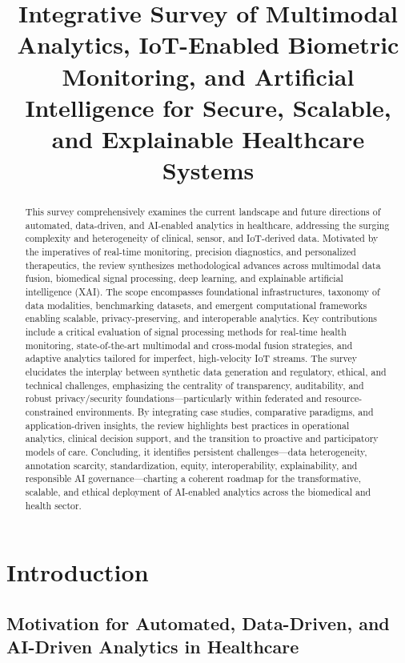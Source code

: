 \title{Integrative Survey of Multimodal Analytics, IoT-Enabled Biometric Monitoring, and Artificial Intelligence for Secure, Scalable, and Explainable Healthcare Systems}
\maketitle

\begin{abstract}
This survey comprehensively examines the current landscape and future directions of automated, data-driven, and AI-enabled analytics in healthcare, addressing the surging complexity and heterogeneity of clinical, sensor, and IoT-derived data. Motivated by the imperatives of real-time monitoring, precision diagnostics, and personalized therapeutics, the review synthesizes methodological advances across multimodal data fusion, biomedical signal processing, deep learning, and explainable artificial intelligence (XAI). The scope encompasses foundational infrastructures, taxonomy of data modalities, benchmarking datasets, and emergent computational frameworks enabling scalable, privacy-preserving, and interoperable analytics. Key contributions include a critical evaluation of signal processing methods for real-time health monitoring, state-of-the-art multimodal and cross-modal fusion strategies, and adaptive analytics tailored for imperfect, high-velocity IoT streams. The survey elucidates the interplay between synthetic data generation and regulatory, ethical, and technical challenges, emphasizing the centrality of transparency, auditability, and robust privacy/security foundations—particularly within federated and resource-constrained environments. By integrating case studies, comparative paradigms, and application-driven insights, the review highlights best practices in operational analytics, clinical decision support, and the transition to proactive and participatory models of care. Concluding, it identifies persistent challenges—data heterogeneity, annotation scarcity, standardization, equity, interoperability, explainability, and responsible AI governance—charting a coherent roadmap for the transformative, scalable, and ethical deployment of AI-enabled analytics across the biomedical and health sector.
\end{abstract}

\section{Introduction}

\subsection{Motivation for Automated, Data-Driven, and AI-Driven Analytics in Healthcare}

